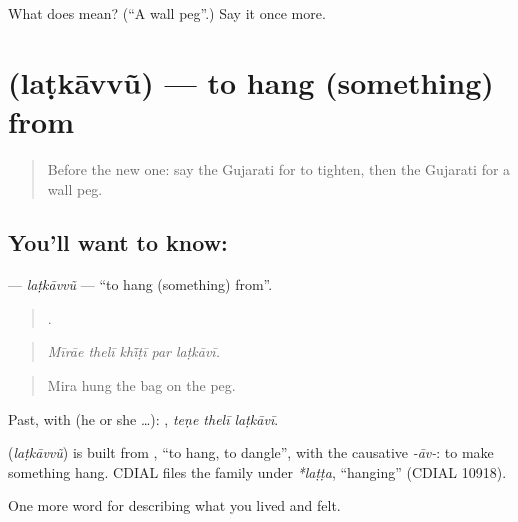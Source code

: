 \begin{tcolorbox}[breakable,colback=teal!4,colframe=teal!35!black,title={Before you move on}]
What does  mean? (\textquotedblleft{}A wall peg\textquotedblright{}.) Say it once more.
\end{tcolorbox}
\section[\texorpdfstring{\gu{લટકાવવું} (laṭkāvvũ)}{લટકાવવું (laṭkāvvũ)}]{ (laṭkāvvũ) — to hang (something) from}

\label{lesson:GU-C514-latkavvu}



\begin{quote}
Before the new one: say the Gujarati for to tighten, then the Gujarati for a wall peg.
\end{quote}

\subsection*{You'll want to know: }
\textbf{} — \emph{laṭkāvvũ} — \textquotedblleft{}to hang (something) from\textquotedblright{}.

\begin{quote}
    .
\end{quote}

\begin{quote}
\emph{Mīrāe thelī khī̃ṭī par laṭkāvī.}
\end{quote}

\begin{quote}
Mira hung the bag on the peg.
\end{quote}

Past, with  (he or she …):   , \emph{teṇe thelī laṭkāvī}.

\begin{cousinweb}
\textbf{} (\emph{laṭkāvvũ}) is built from \textbf{}, \textquotedblleft{}to hang, to dangle\textquotedblright{}, with the causative \emph{-āv-}: to make something hang. CDIAL files the family under \emph{*laṭṭa}, \textquotedblleft{}hanging\textquotedblright{} (CDIAL 10918).
\end{cousinweb}

\begin{grammarlens}[title={What you've built}]
One more word for describing what you lived and felt.
\end{grammarlens}

